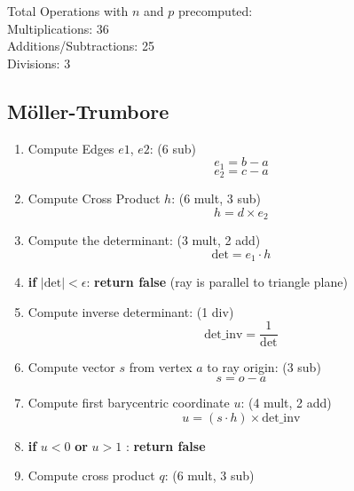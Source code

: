 \documentclass{article}
\begin{document}
Total Operations with $n$ and $p$ precomputed:\\
Multiplications: 36\\
Additions/Subtractions: 25\\
Divisions: 3


\subsection*{Möller-Trumbore}
\begin{enumerate}
    \item Compute Edges $e1$, $e2$: (6 sub)
            \begin{equation*}
                e_1 = b - a
            \end{equation*}
                        \begin{equation*}
                e_2 = c - a
            \end{equation*}
    \item Compute Cross Product $h$: (6 mult, 3 sub)
            \begin{equation*}
                h = d \times e_2
            \end{equation*}
    \item Compute the determinant: (3 mult, 2 add)
        \begin{equation*}
            \text{det} = e_1 \cdot h
        \end{equation*}
    \item \textbf{if } $|\text{det}| < \epsilon$: \textbf{return false} (ray is parallel to triangle plane)
    \item Compute inverse determinant: (1 div)
        \begin{equation*}
            \text{det\_inv} = \frac{1}{\text{det}}
        \end{equation*}
    \item Compute vector $s$ from vertex $a$ to ray origin: (3 sub)
        \begin{equation*}
            s = o - a
        \end{equation*}
    \item Compute first barycentric coordinate $u$: (4 mult, 2 add)
        \begin{equation*}
            u = (s \cdot h) \times \text{det\_inv}
        \end{equation*}
    \item \textbf{if } $u < 0$ \textbf{or} $u > 1$ : \textbf{return false}
    \item Compute cross product $q$: (6 mult, 3 sub)

\end{enumerate}
\end{document}
